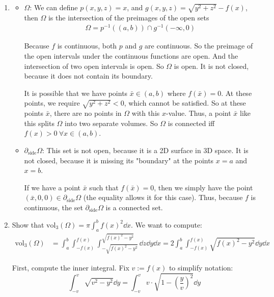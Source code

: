 \documentclass[12pt]{article}
\begin{document}
\begin{enumerate}
    \item 
    \begin{itemize}
        \item \underline{$\Omega$}: We can define $p(x, y, z) = x$, and $g(x, y, z) = \sqrt{y^2+z^2} - f(x)$, then $\Omega$ is the intersection of the preimages of the open sets
        \begin{align*}
            \Omega = p^{-1}((a, b)) \cap g^{-1}(-\infty, 0)
        \end{align*}

        Because $f$ is continuous, both $p$ and $g$ are continuous. So the preimage of the open intervals under the continuous functions are open. And the intersection of two open intervals is open. So $\Omega$ is open. It is not closed, because it does not contain its boundary.

        It is possible that we have points $\bar{x} \in (a, b)$ where $f(\bar{x}) = 0$. At these points, we require $\sqrt{y^2+z^2} < 0$, which cannot be satisfied. So at these points $\bar{x}$, there are no points in $\Omega$ with this $x$-value. Thus, a point $\bar{x}$ like this splits $\Omega$ into two separate volumes. So $\Omega$ is connected iff $f(x) > 0\ \forall x \in (a, b)$.

        \item \underline{$\partial_{\text{side}}\Omega$}: This set is not open, because it is a 2D surface in 3D space. It is not closed, because it is missing its "boundary" at the points $x = a$ and $x = b$.
        
        If we have a point $\bar{x}$ such that $f(\bar{x}) = 0$, then we simply have the point $(\bar{x}, 0, 0) \in \partial_{\text{side}}\Omega$ (the equality allows it for this case). Thus, because $f$ is continuous, the set $\partial_{\text{side}}\Omega$ is a connected set.
    \end{itemize}

    \item Show that $\mathrm{vol}_3(\Omega) = \pi \int_{a}^{b} f(x)^2 \dd x$. We want to compute:
    \begin{align*}
        \mathrm{vol}_3(\Omega) &= \int_{a}^{b} \int_{-f(x)}^{f(x)} \int_{-\sqrt{f(x)^2-y^2}}^{\sqrt{f(x)^2-y^2}} \dd z \dd y \dd x = 2 \int_{a}^{b} \int_{-f(x)}^{f(x)} \sqrt{f(x)^2-y^2} \dd y \dd x
    \end{align*}

    First, compute the inner integral. Fix $v := f(x)$ to simplify notation:
    \[
        \int_{-v}^{v} \sqrt{v^2-y^2} \dd y = \int_{-v}^{v} v \cdot \sqrt{1-(\frac{y}{v})^2} \dd y
    \]


\end{enumerate}
\end{document}
